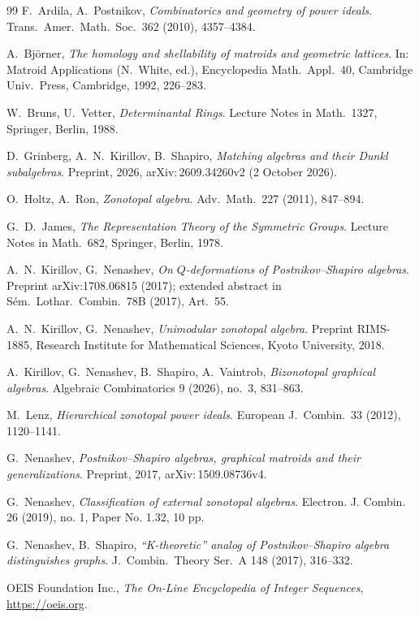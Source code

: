 \documentclass[reqno]{article}
\theoremstyle{plain} %
\theoremstyle{definition}
\theoremstyle{remark}
\numberwithin{equation}{section}
\begin{document}
\begin{thebibliography}{99}
 F.~Ardila, A.~Postnikov, \emph{Combinatorics and geometry of power ideals}. Trans.\ Amer.\ Math.\ Soc.\ 362 (2010), 4357--4384.

 A.~Bj\"orner, \emph{The homology and shellability of matroids and geometric lattices}. In: Matroid Applications (N.~White, ed.), Encyclopedia Math.\ Appl.\ 40, Cambridge Univ.\ Press, Cambridge, 1992, 226--283.

 W.~Bruns, U.~Vetter, \emph{Determinantal Rings}. Lecture Notes in Math.\ 1327, Springer, Berlin, 1988.

 D.~Grinberg, A.~N.~Kirillov, B.~Shapiro,
\emph{Matching algebras and their Dunkl subalgebras}.
Preprint, 2026, arXiv:\,2609.34260v2 (2 October 2026).

 O.~Holtz, A.~Ron, \emph{Zonotopal algebra}. Adv.\ Math.\ 227 (2011), 847--894.

 G.~D.~James, \emph{The Representation Theory of the Symmetric Groups}. Lecture Notes in Math.\ 682, Springer, Berlin, 1978.

 A.~N.~Kirillov, G.~Nenashev, \emph{On $Q$-deformations of Postnikov--Shapiro algebras}. Preprint arXiv:1708.06815 (2017); extended abstract in S\'em.\ Lothar.\ Combin.\ 78B (2017), Art.~55.

 A.~N.~Kirillov, G.~Nenashev, \emph{Unimodular zonotopal algebra}. Preprint RIMS-1885, Research Institute for Mathematical Sciences, Kyoto University, 2018.

 A.~Kirillov, G.~Nenashev, B.~Shapiro, A.~Vaintrob, \emph{Bizonotopal graphical algebras}. Algebraic Combinatorics 9 (2026), no.~3, 831--863.

 M.~Lenz, \emph{Hierarchical zonotopal power ideals}. European J.\ Combin.\ 33 (2012), 1120--1141.

 G.~Nenashev, \emph{Postnikov--Shapiro algebras, graphical matroids and their  generalizations}. Preprint, 2017,  arXiv:\,1509.08736v4.

 G.~Nenashev,  \emph{Classification of external zonotopal algebras}.
  Electron. J. Combin. 26 (2019), no. 1, Paper No. 1.32, 10 pp.

 G.~Nenashev, B.~Shapiro,  \emph{``K-theoretic'' analog of
  Postnikov--Shapiro algebra distinguishes graphs}.
J.\ Combin.\ Theory Ser.\ A 148 (2017), 316--332.

 OEIS Foundation Inc., \emph{The On-Line Encyclopedia of Integer Sequences}, \url{https://oeis.org}.


\end{thebibliography}
\end{document}
